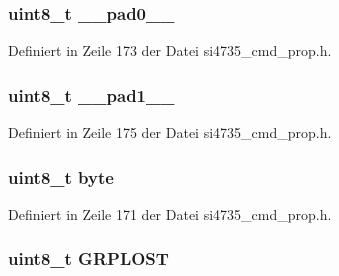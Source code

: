 \subsubsection[{\+\_\+\+\_\+pad0\+\_\+\+\_\+}]{\setlength{\rightskip}{0pt plus 5cm}uint8\+\_\+t \+\_\+\+\_\+pad0\+\_\+\+\_\+}\label{unionfm__rds__status__resp2_a8b4eebe79ded0459acec2f4950102ba3}


Definiert in Zeile 173 der Datei si4735\+\_\+cmd\+\_\+prop.\+h.

\hypertarget{unionfm__rds__status__resp2_a77f12d2e278bd5c07712648ac0df5e08}{}
\subsubsection[{\+\_\+\+\_\+pad1\+\_\+\+\_\+}]{\setlength{\rightskip}{0pt plus 5cm}uint8\+\_\+t \+\_\+\+\_\+pad1\+\_\+\+\_\+}\label{unionfm__rds__status__resp2_a77f12d2e278bd5c07712648ac0df5e08}


Definiert in Zeile 175 der Datei si4735\+\_\+cmd\+\_\+prop.\+h.

\hypertarget{unionfm__rds__status__resp2_a96f44d20f1dbf1c8785a7bc99a46164c}{}
\subsubsection[{byte}]{\setlength{\rightskip}{0pt plus 5cm}uint8\+\_\+t byte}\label{unionfm__rds__status__resp2_a96f44d20f1dbf1c8785a7bc99a46164c}


Definiert in Zeile 171 der Datei si4735\+\_\+cmd\+\_\+prop.\+h.

\hypertarget{unionfm__rds__status__resp2_a430b332cff3a3786c4854defcd95d078}{}
\subsubsection[{G\+R\+P\+L\+O\+S\+T}]{\setlength{\rightskip}{0pt plus 5cm}uint8\+\_\+t G\+R\+P\+L\+O\+S\+T}\label{unionfm__rds__status__resp2_a430b332cff3a3786c4854defcd95d078}


